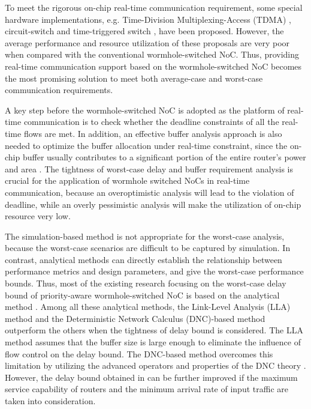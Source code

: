 \documentclass[preprint]{elsarticle}
\begin{document}
To meet the rigorous on-chip real-time communication requirement, some special hardware implementations, e.g. Time-Division Multiplexing-Access (TDMA) \cite{GoDR05}, circuit-switch \cite{6628254} and time-triggered switch \cite{4617280}, have been proposed. However, the average performance and resource utilization of these proposals are very poor when compared with the conventional wormhole-switched NoC. Thus, providing real-time communication support based on the wormhole-switched NoC becomes the most promising solution to meet both average-case and worst-case communication requirements.

A key step before the wormhole-switched NoC is adopted as the platform of real-time communication is to check whether the deadline constraints of all the real-time flows are met. In addition, an effective buffer analysis approach is also needed to optimize the buffer allocation under real-time constraint, since the on-chip buffer usually contributes to a significant portion of the entire router's power and area \cite{pkundu,5507566}. The tightness of worst-case delay and buffer requirement analysis is crucial for the application of wormhole switched NoCs in real-time communication, because an overoptimistic analysis will lead to the violation of deadline, while an overly pessimistic analysis will make the utilization of on-chip resource very low.

The simulation-based method is not appropriate for the worst-case analysis, because the worst-case scenarios are difficult to be captured by simulation. In contrast, analytical methods can directly establish the relationship between performance metrics and design parameters, and give the worst-case performance bounds. Thus, most of the existing research focusing on the worst-case delay bound of priority-aware wormhole-switched NoC is based on the analytical method \cite{Shi:2008:RCA:1397757.1397996,73,Qian489900,LuJS05,707545,708526,189}. Among all these analytical methods, the Link-Level Analysis (LLA) method \cite{73,189} and the Deterministic Network Calculus (DNC)-based method \cite{Qian489900} outperform the others when the tightness of delay bound is considered. The LLA method assumes that the buffer size is large enough to eliminate the influence of flow control on the delay bound. The DNC-based method \cite{Qian489900} overcomes this limitation by utilizing the advanced operators and properties of the DNC theory \cite{Boudec2001Network}. However, the delay bound obtained in \cite{Qian489900} can be further improved if the maximum service capability of routers and the minimum arrival rate of input traffic are taken into consideration.
\end{document}
